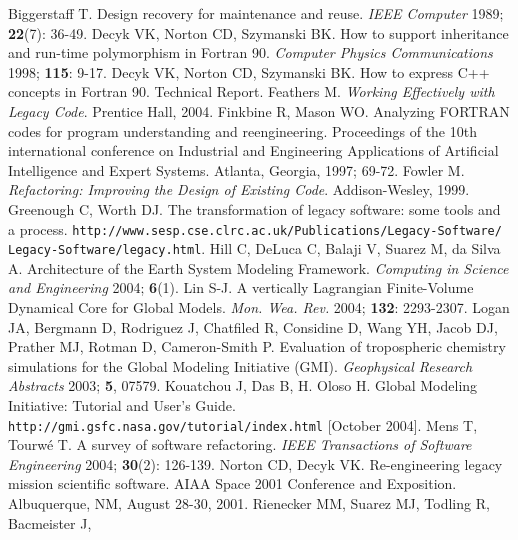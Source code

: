 \documentclass[11pt]{article}
\begin{document}
\begin{thebibliography}{99}
 Biggerstaff T.
    Design recovery for maintenance and reuse. 
    {\em IEEE Computer} 1989; {\bf 22}(7): 36-49.
%
 Decyk VK, Norton CD, Szymanski BK.
    How to support inheritance and run-time polymorphism in Fortran 90. 
    {\em Computer Physics Communications} 1998; {\bf 115}: 9-17.
%
 Decyk VK, Norton CD, Szymanski BK.
    How to express C++ concepts in Fortran 90. Technical Report.
%
 Feathers M.
    {\em Working Effectively with Legacy Code}.
    Prentice Hall, 2004.
%
 Finkbine R, Mason WO.
    Analyzing FORTRAN codes for program understanding and reengineering.
    Proceedings of the 10th international conference on Industrial and 
    Engineering Applications of Artificial Intelligence and Expert Systems.
    Atlanta, Georgia, 1997; 69-72.
%
 Fowler M.
    {\em Refactoring: Improving the Design of Existing Code}.
    Addison-Wesley, 1999.
%
 Greenough C, Worth DJ.
    The transformation of legacy software: some tools and a process.
    {\tt http://www.sesp.cse.clrc.ac.uk/Publications/Legacy-Software/\\Legacy-Software/legacy.html}.
%
 Hill C, DeLuca C, Balaji V, Suarez M, da Silva A. 
    Architecture of the Earth System Modeling Framework.
    {\em Computing in Science and Engineering} 2004; {\bf 6}(1). 
%
 Lin S-J.
    A vertically Lagrangian Finite-Volume Dynamical Core for Global Models.
    {\em Mon. Wea. Rev.} 2004; {\bf 132}: 2293-2307.
%
 Logan JA, Bergmann D, Rodriguez J, Chatfiled R, 
   Considine D, Wang YH, Jacob DJ, Prather MJ, Rotman D, Cameron-Smith P.
   Evaluation of tropospheric chemistry simulations for the Global 
   Modeling Initiative (GMI).
   {\em Geophysical Research Abstracts} 2003; {\bf 5}, 07579.
%
 Kouatchou J, Das B, H. Oloso H.
    {G}lobal {M}odeling {I}nitiative: Tutorial and User's Guide.
    {\tt http://gmi.gsfc.nasa.gov/tutorial/index.html} [October 2004].
%
 Mens T,  Tourw\'e T.
    A survey of software refactoring.
    {\em IEEE Transactions of Software Engineering} 2004; {\bf 30}(2): 126-139.
%
 Norton CD, Decyk VK.
    Re-engineering legacy mission scientific software.
    AIAA Space 2001 Conference and Exposition.
    Albuquerque, NM, August 28-30, 2001.
%
 Rienecker MM, Suarez MJ, Todling R, Bacmeister J, 

\end{thebibliography}
\end{document}
